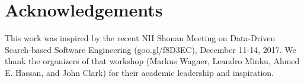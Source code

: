 \documentclass[sigconf]{acmart}
\begin{document}
\section*{Acknowledgements}
This work was inspired by the recent
 NII Shonan Meeting on Data-Driven Search-based Software Engineering (goo.gl/f8D3EC), December 11-14, 2017.
We thank the organizers of that workshop 
(Markus Wagner,  
 Leandro Minku,  
 Ahmed E. Hassan, and 
 John Clark)
for their academic
leadership and inspiration.

 

 
\end{document}
